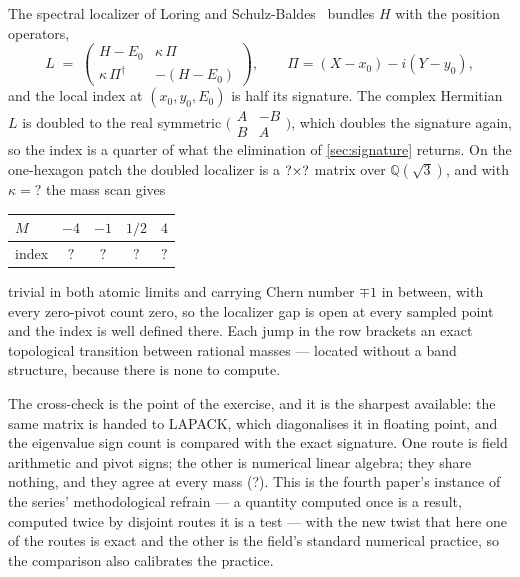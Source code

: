 \documentclass[11pt,a4paper]{article}
\newcommand{\MTKappa}{?}\newcommand{\MTScanIndices}{?}
\newcommand{\MTIdxAtomic}{?}\newcommand{\MTIdxNegOne}{?}
\newcommand{\MTIdxHalf}{?}\newcommand{\MTNumpyAgree}{?}
\newcommand{\QQ}{\mathbb{Q}}
\theoremstyle{definition}
\begin{document}
The spectral localizer of Loring and
Schulz-Baldes~\cite{LoringSchulzBaldes2017} bundles $H$ with the position
operators,
%
\begin{equation}
L \;=\;
\begin{pmatrix}
H - E_0 & \kappa\,\Pi \\
\kappa\,\Pi^\dagger & -(H - E_0)
\end{pmatrix},
\qquad
\Pi = (X - x_0) - i (Y - y_0),
\label{eq:localizer}
\end{equation}
%
and the local index at $(x_0, y_0, E_0)$ is half its signature. The complex
Hermitian $L$ is doubled to the real symmetric
$\bigl(\begin{smallmatrix}A & -B\\ B & A\end{smallmatrix}\bigr)$, which doubles the
signature again, so the index is a quarter of what the elimination of
\cref{sec:signature} returns. On the one-hexagon patch the doubled localizer
is a $? \times ?$ matrix over $\QQ(\sqrt3)$, and with
$\kappa = \MTKappa$ the mass scan gives
%
\begin{center}
\begin{tabular}{lcccc}
\toprule
$M$ & $-4$ & $-1$ & $1/2$ & $4$ \\
\midrule
index & $\MTIdxAtomic$ & $\MTIdxNegOne$ & $\MTIdxHalf$ & $\MTIdxAtomic$ \\
\bottomrule
\end{tabular}
\end{center}
%
trivial in both atomic limits and carrying Chern number $\mp 1$ in between,
with every zero-pivot count zero, so the localizer gap is open at every
sampled point and the index is well defined there. Each jump in the row
brackets an exact topological transition between rational masses ---
located without a band structure, because there is none to compute.

The cross-check is the point of the exercise, and it is the sharpest
available: the same matrix is handed to LAPACK, which diagonalises it in
floating point, and the eigenvalue sign count is compared with the exact
signature. One route is field arithmetic and pivot signs; the other is
numerical linear algebra; they share nothing, and they agree at every mass
(\MTNumpyAgree). This is the fourth paper's instance of the series'
methodological refrain --- a quantity computed once is a result, computed
twice by disjoint routes it is a test --- with the new twist that here one
of the routes is exact and the other is the field's standard numerical
practice, so the comparison also calibrates the practice.
\end{document}
